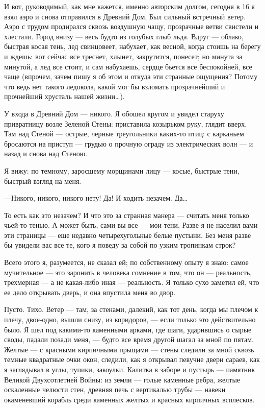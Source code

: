 \documentclass[11pt,openany]{book}
\begin{document}
И вот, руководимый, как мне кажется, именно авторским долгом, сегодня в 16 я взял аэро и снова отправился в Древний Дом. Был сильный встречный ветер. Аэро с трудом продирался сквозь воздушную чащу, прозрачные ветви свистели и хлестали. Город внизу --- весь будто из голубых глыб льда. Вдруг --- облако, быстрая косая тень, лед свинцовеет, набухает, как весной, когда стоишь на берегу и ждешь: вот сейчас все треснет, хлынет, закрутится, понесет; но минута за минутой, а лед все стоит, и сам набухаешь, сердце бьется все беспокойней, все чаще (впрочем, зачем пишу я об этом и откуда эти странные ощущения? Потому что ведь нет такого ледокола, какой мог бы взломать прозрачнейший и прочнейший хрусталь нашей жизни\ldots{}).

У входа в Древний Дом --- никого. Я обошел кругом и увидел старуху привратницу возле Зеленой Стены: приставила козырьком руку, глядит вверх. Там над Стеной --- острые, черные треугольники каких-то птиц: с карканьем бросаются на приступ --- грудью о прочную ограду из электрических волн --- и назад и снова над Стеною.

Я вижу: по темному, заросшему морщинами лицу --- косые, быстрые тени, быстрый взгляд на меня.

---Никого, никого, никого нету! Да! И ходить незачем. Да\ldots{}

То есть как это незачем? И что это за странная манера --- считать меня только чьей-то тенью. А может быть, сами вы все --- мои тени. Разве я не населил вами эти страницы --- еще недавно четырехугольные белые пустыни. Без меня разве бы увидели вас все те, кого я поведу за собой по узким тропинкам строк?

Всего этого я, разумеется, не сказал ей; по собственному опыту я знаю: самое мучительное --- это заронить в человека сомнение в том, что он --- реальность, трехмерная --- а не какая-либо иная --- реальность. Я только сухо заметил ей, что ее дело открывать дверь, и она впустила меня во двор.

Пусто. Тихо. Ветер --- там, за стенами, далекий, как тот день, когда мы плечом к плечу, двое-одно, вышли снизу, из коридоров, --- если только это действительно было. Я шел под какими-то каменными арками, где шаги, ударившись о сырые своды, падали позади меня, --- будто все время другой шагал за мной по пятам. Желтые --- с красными кирпичными прыщами --- стены следили за мной сквозь темные квадратные очки окон, следили, как я открывал певучие двери сараев, как я заглядывал в углы, тупики, закоулки. Калитка в заборе и пустырь --- памятник Великой Двухсотлетней Войны: из земли --- голые каменные ребра, желтые оскаленные челюсти стен, древняя печь с вертикалью трубы --- навеки окаменевший корабль среди каменных желтых и красных кирпичных всплесков.
\end{document}
